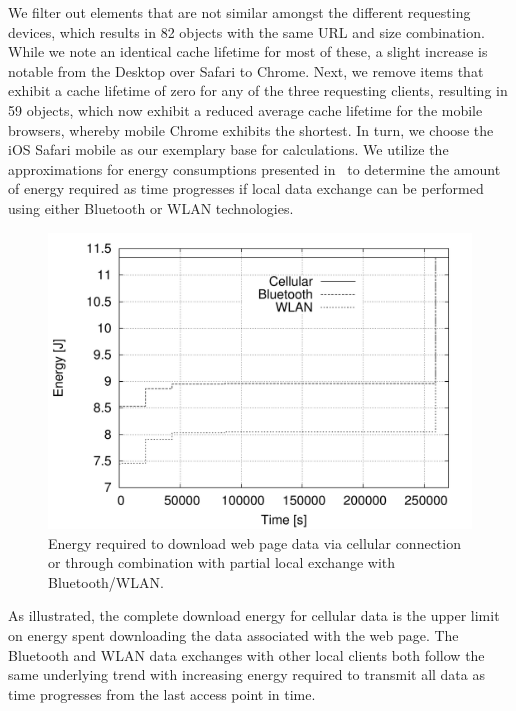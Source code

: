 \documentclass[letterpaper,conference]{IEEEtran}
\begin{document}
We filter out elements that are not similar amongst the different requesting devices, which results in 82 objects with the same URL and size combination. 
While we note an identical cache lifetime for most of these, a slight increase is notable from the Desktop over Safari to Chrome.  Next, we remove items that exhibit a cache lifetime of zero for any of the three requesting clients, resulting in 59 objects, which now exhibit a reduced average cache lifetime for the mobile browsers, whereby mobile Chrome exhibits the shortest.
In turn, we choose the iOS Safari mobile as our exemplary base for calculations. 
We utilize the approximations for energy consumptions presented in~\cite{PeFiWi11} to determine the amount of energy required as time progresses if local data exchange can be performed using either Bluetooth or WLAN technologies. 
\begin{figure}
	\centering
	\includegraphics[width=.95\linewidth]{energy_ios_time}
	\caption{Energy required to download web page data via cellular connection or through combination with partial local exchange with Bluetooth/WLAN.}
	\label{fig:ios_time_energy}
\end{figure}
As illustrated, the complete download energy for cellular data is the upper limit on energy spent downloading the data associated with the web page. 
The Bluetooth and WLAN data exchanges with other local clients both follow the same underlying trend with increasing energy required to transmit all data as time progresses from the last access point in time.
\end{document}
